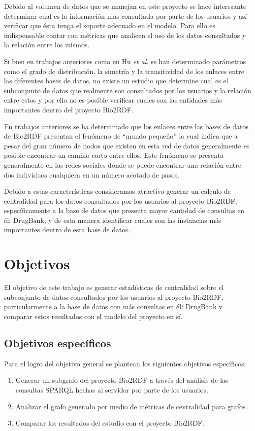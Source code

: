 Debido al volumen de datos que se manejan en este proyecto se hace interesante
determinar cual es la información más consultada por parte de los usuarios y 
así verificar que ésta tenga el soporte adecuado en el modelo. 
Para ello es indispensable contar con métricas que analicen el uso de los datos
consultados y la relación entre los mismos.

Si bien en trabajos anteriores como en Hu \emph{et al.}\cite{hu2015link} se han
determinado parámetros como el grado de distribución, la simetría y la
transitividad de los enlaces entre las diferentes bases de datos, no existe un
estudio que determine cual es el subconjunto de datos que realmente son
consultados por los usuarios y la relación entre estos y por ello no es posible
verificar cuales son las entidades más importantes dentro del proyecto Bio2RDF.

En trabajos anteriores\cite{hu2015link} se ha determinado que los enlaces entre
las bases de datos de Bio2RDF presentan el fenómeno de ``mundo pequeño'' lo cual
indica que a pesar del gran número de nodos que existen en esta red de datos
generalmente es posible encontrar un camino corto entre ellos. Este fenómeno se
presenta generalmente en las redes sociales donde se puede encontrar una
relación entre dos individuos cualquiera en un número acotado de pasos.

Debido a estas características consideramos atractivo generar un cálculo de
centralidad para los datos consultados por los usuarios al proyecto Bio2RDF,
específicamente a la base de datos que presenta mayor cantidad de consultas en
él: DrugBank, y de esta manera identificar cuales son las instancias más
importantes dentro de esta base de datos.

\section{Objetivos}

El objetivo de este trabajo es generar estadísticas de centralidad sobre el
subconjunto de datos consultados por los usuarios al proyecto Bio2RDF,
particularmente a la base de datos con más consultas en él: DrugBank y comparar
estos resultados con el modelo del proyecto en sí.

\subsection{Objetivos específicos}
Para el logro del objetivo general se plantean los siguientes objetivos
específicos:
\begin{enumerate}
  \item
    Generar un subgrafo del proyecto Bio2RDF a través del análisis de las
    consultas SPARQL hechas al servidor por parte de los usuarios.
  \item
    Analizar el grafo generado por medio de métricas de centralidad para grafos.
  \item
    Comparar los resultados del estudio con el proyecto Bio2RDF.
\end{enumerate}
